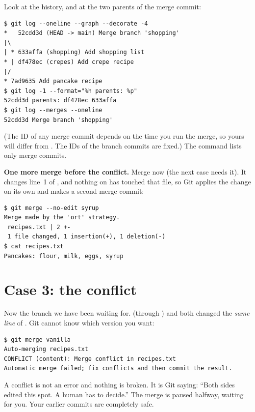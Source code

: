 Look at the history, and at the two parents of the merge commit:

\begin{lstlisting}
$ git log --oneline --graph --decorate -4
*   52cdd3d (HEAD -> main) Merge branch 'shopping'
|\
| * 633affa (shopping) Add shopping list
* | df478ec (crepes) Add crepe recipe
|/
* 7ad9635 Add pancake recipe
$ git log -1 --format="%h parents: %p"
52cdd3d parents: df478ec 633affa
$ git log --merges --oneline
52cdd3d Merge branch 'shopping'
\end{lstlisting}

(The ID of any merge commit depends on the time you run the merge, so yours will differ from . The IDs of the branch commits are fixed.) The command  lists only merge commits.

\textbf{One more merge before the conflict.} Merge  now (the next case needs it). It changes line~1 of , and nothing on  has touched that file, so Git applies the change on its own and makes a second merge commit:

\begin{lstlisting}
$ git merge --no-edit syrup
Merge made by the 'ort' strategy.
 recipes.txt | 2 +-
 1 file changed, 1 insertion(+), 1 deletion(-)
$ cat recipes.txt
Pancakes: flour, milk, eggs, syrup
\end{lstlisting}

\section{Case 3: the conflict}

Now the branch we have been waiting for.  (through ) and  both changed the \emph{same line} of . Git cannot know which version you want:

\begin{lstlisting}
$ git merge vanilla
Auto-merging recipes.txt
CONFLICT (content): Merge conflict in recipes.txt
Automatic merge failed; fix conflicts and then commit the result.
\end{lstlisting}

\begin{keyidea}
A conflict is not an error and nothing is broken. It is Git saying: ``Both sides edited this spot. A human has to decide.'' The merge is paused halfway, waiting for you. Your earlier commits are completely safe.
\end{keyidea}

